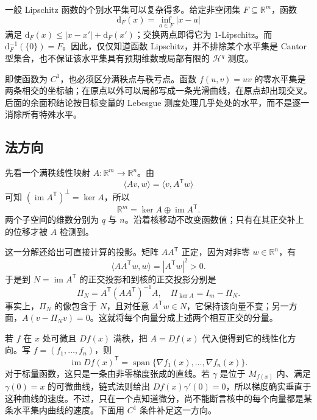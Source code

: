 一般 Lipschitz 函数的个别水平集可以复杂得多。给定非空闭集 \(F\subseteq\mathbb R^m\)，函数
\[
 \mathrm{d}_F(x)=\inf_{a\in F}|x-a|
\]
满足 \(\mathrm{d}_F(x)\leq|x-x'|+\mathrm{d}_F(x')\)；交换两点即得它为 \(1\)-Lipschitz。而 \(\mathrm{d}_F^{-1}(\{0\})=F\)。因此，仅仅知道函数 Lipschitz，并不排除某个水平集是 Cantor 型集合，也不保证该水平集具有预期维数或局部有限的 \(\mathcal H^q\) 测度。

\ProseParagraphBreak

即使函数为 \(C^1\)，也必须区分满秩点与秩亏点。函数 \(f(u,v)=uv\) 的零水平集是两条相交的坐标轴；在原点以外可以局部写成一条光滑曲线，在原点却出现交叉。后面的余面积结论按目标变量的 Lebesgue 测度处理几乎处处的水平，而不是逐一消除所有特殊水平。

\subsection{法方向}
\label{b1:subsec:180102}

先看一个满秩线性映射 \(A:\mathbb R^m\rightarrow\mathbb R^n\)。由
\[
 \langle Av,w\rangle=\langle v,A^{\mathsf T}w\rangle
\]
可知 \((\operatorname{im}A^{\mathsf T})^\perp=\ker A\)，所以
\[
 \mathbb R^m=\ker A\oplus\operatorname{im}A^{\mathsf T}.
\]
两个子空间的维数分别为 \(q\) 与 \(n\)。沿着核移动不改变函数值；只有在其正交补上的位移才被 \(A\) 检测到。

\ProseParagraphBreak

这一分解还给出可直接计算的投影。矩阵 \(AA^{\mathsf T}\) 正定，因为对非零 \(w\in\mathbb R^n\)，有
\[
 \langle AA^{\mathsf T}w,w\rangle=|A^{\mathsf T}w|^2>0.
\]
于是到 \(N=\operatorname{im}A^{\mathsf T}\) 的正交投影和到核的正交投影分别是
\[
 \Pi_N=A^{\mathsf T}(AA^{\mathsf T})^{-1}A,
 \quad \Pi_{\ker A}=I_m-\Pi_N.
\]
事实上，\(\Pi_N\) 的像包含于 \(N\)，且对任意 \(A^{\mathsf T}w\in N\)，它保持该向量不变；另一方面，\(A(v-\Pi_Nv)=0\)。这就将每个向量分成上述两个相互正交的分量。

\ProseParagraphBreak

若 \(f\) 在 \(x\) 处可微且 \(Df(x)\) 满秩，把 \(A=Df(x)\) 代入便得到它的线性化方向。写 \(f=(f_1,\ldots,f_n)\)，则
\[
 \operatorname{im}Df(x)^{\mathsf T}
 =\operatorname{span}\{\nabla f_1(x),\ldots,\nabla f_n(x)\}.
\]
对于标量函数，这只是一条由非零梯度张成的直线。若 \(\gamma\) 是位于 \(M_{f(x)}\) 内、满足 \(\gamma(0)=x\) 的可微曲线，链式法则给出 \(Df(x)\gamma'(0)=0\)，所以梯度确实垂直于这种曲线的速度。不过，只在一个点知道微分，尚不能断言核中的每个向量都是某条水平集内曲线的速度。下面用 \(C^1\) 条件补足这一方向。

